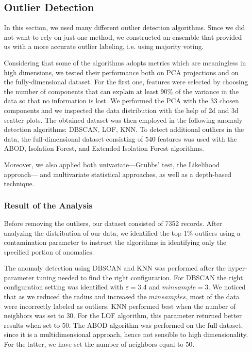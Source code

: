 \documentclass[10pt, a4paper, twocolumn]{article}
\begin{document}
\subsection{Outlier Detection}

In this section, we used many different outlier detection algorithms. Since we did not want to rely on just one method, we constructed an ensemble that provided us with a more accurate outlier labeling, i.e. using majority voting. 

Considering that some of the algorithms adopts metrics which are meaningless in high dimensions, we tested their performance both on PCA projections and on the fully-dimensional dataset. For the first one, features were selected by choosing the number of components that can explain at least 90\% of the variance in the data so that no information is lost. We performed the PCA with the 33 chosen components and we inspected the data distribution with the help of 2d and 3d scatter plots. The obtained dataset was then employed in the following anomaly detection algorithms: DBSCAN, LOF, KNN. To detect additional outliers in the data, the full-dimensional dataset consisting of 540 features was used with the ABOD, Isolation Forest, and Extended Isolation Forest algorithms.

Moreover, we also applied both univariate---Grubbs' test, the Likelihood approach--- and multivariate statistical approaches, as well as a depth-based technique.

\subsubsection*{Result of the Analysis}

Before removing the outliers, our dataset consisted of 7352 records. After analyzing the distribution of our data, we identified the top 1\% outliers using a contamination parameter to instruct the algorithms in identifying only the specified portion of anomalies.

The anomaly detection using DBSCAN and KNN was performed after the hyper-parameter tuning needed to find the right configuration. For DBSCAN the right configuration setting was identified with $\varepsilon = 3.4$ and $min sample = 3$. We noticed that as we reduced the radius and increased the $min samples$, most of the data were incorrectly labeled as outliers. KNN performed best when the number of neighbors was set to 30. For the LOF algorithm, this parameter returned better results when set to 50. The ABOD algorithm was performed on the full dataset, since it is a multidimensional approach, hence not sensible to high dimensionality. For the latter, we have set the number of neighbors equal to 50. 
\end{document}
